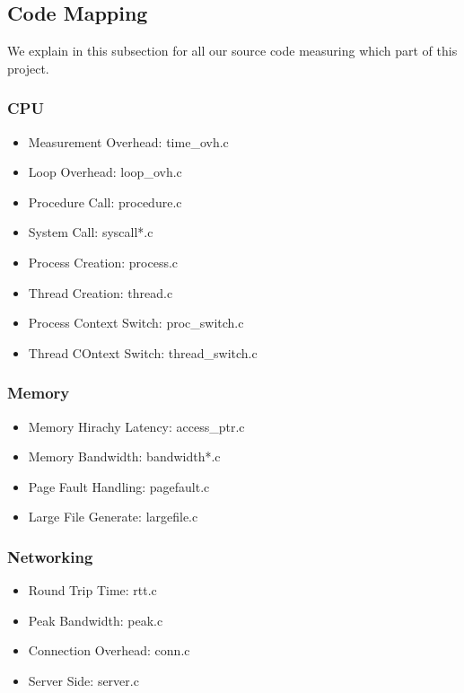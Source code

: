 \subsection{Code Mapping}

We explain in this subsection for all our source code measuring which part of this project.

\subsubsection{CPU}
\begin{itemize}
    \item Measurement Overhead: time_ovh.c
    \item Loop Overhead: loop_ovh.c
    \item Procedure Call: procedure.c
    \item System Call: syscall*.c
    \item Process Creation: process.c
    \item Thread Creation: thread.c
    \item Process Context Switch: proc_switch.c
    \item Thread COntext Switch: thread_switch.c
\end{itemize}

\subsubsection{Memory}
\begin{itemize}
    \item Memory Hirachy Latency: access_ptr.c
    \item Memory Bandwidth: bandwidth*.c
    \item Page Fault Handling: pagefault.c
    \item Large File Generate: largefile.c
\end{itemize}

\subsubsection{Networking}
\begin{itemize}
    \item Round Trip Time: rtt.c
    \item Peak Bandwidth: peak.c
    \item Connection Overhead: conn.c
    \item Server Side: server.c
\end{itemize}

